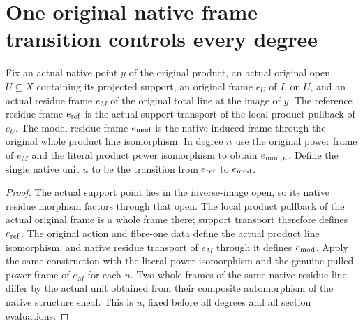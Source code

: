 \section{One original native frame transition controls every degree}

\begin{definition}\label{def:native-tc-compatible-product-residue-frames}
\leanok
{}
Fix an actual native point $y$ of the original product, an actual
original open $U\subseteq X$ containing its projected support,
an original frame $e_U$ of $L$ on $U$, and an actual residue frame
$e_M$ of the original total line at the image of $y$. The
reference residue frame $e_{\rm ref}$ is the actual support
transport of the local product pullback of $e_U$. The model
residue frame $e_{\rm mod}$ is the native induced frame through
the original whole product line isomorphism. In degree $n$ use
the original power frame of $e_M$ and the literal product power
isomorphism to obtain $e_{{\rm mod},n}$. Define the single native
unit $u$ to be the transition from $e_{\rm ref}$ to $e_{\rm mod}$.
\end{definition}
\begin{proof}
The actual support point lies in the inverse-image open, so its
native residue morphism factors through that open. The local
product pullback of the actual original frame is a whole frame
there; support transport therefore defines $e_{\rm ref}$. The
original action and fibre-one data define the actual product
line isomorphism, and native residue transport of $e_M$ through
it defines $e_{\rm mod}$. Apply the same construction with the
literal power isomorphism and the genuine pulled power frame of
$e_M$ for each $n$. Two whole frames of the same native residue
line differ by the actual unit obtained from their composite
automorphism of the native structure sheaf. This is $u$, fixed
before all degrees and all section evaluations.
\end{proof}

